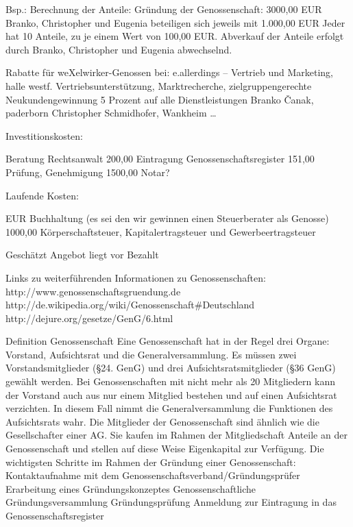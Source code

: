 Bsp.: Berechnung der Anteile:
Gründung der Genossenschaft: 3000,00 EUR
Branko, Christopher und Eugenia beteiligen sich jeweils mit 1.000,00 EUR
Jeder hat 10 Anteile, zu je einem Wert von 100,00 EUR.
Abverkauf der Anteile erfolgt durch Branko, Christopher und Eugenia abwechselnd.


Rabatte für weXelwirker-Genossen bei:
e.allerdings – Vertrieb und Marketing, halle westf.
Vertriebsunterstützung, Marktrecherche, zielgruppengerechte Neukundengewinnung
5 Prozent auf alle Dienstleistungen
Branko Čanak, paderborn
Christopher Schmidhofer, Wankheim
…


 
Investitionskosten:

Beratung Rechtsanwalt
200,00
Eintragung Genossenschaftsregister
151,00
Prüfung, Genehmigung
1500,00
Notar?









Laufende Kosten:

EUR
Buchhaltung (es sei den wir gewinnen einen Steuerberater als Genosse)
1000,00
Körperschaftsteuer, Kapitalertragsteuer und Gewerbeertragsteuer










Geschätzt
Angebot liegt vor
Bezahlt


Links zu weiterführenden Informationen zu Genossenschaften:
http://www.genossenschaftsgruendung.de
http://de.wikipedia.org/wiki/Genossenschaft\#Deutschland
http://dejure.org/gesetze/GenG/6.html

Definition Genossenschaft
Eine Genossenschaft hat in der Regel drei Organe: Vorstand, Aufsichtsrat und die Generalversammlung. Es müssen zwei Vorstandsmitglieder (\S 24. GenG) und drei Aufsichtsratsmitglieder (\S 36 GenG) gewählt werden. Bei Genossenschaften mit nicht mehr als 20 Mitgliedern kann der Vorstand auch aus nur einem Mitglied bestehen und auf einen Aufsichtsrat verzichten. In diesem Fall nimmt die Generalversammlung die Funktionen des Aufsichtsrats wahr.
Die Mitglieder der Genossenschaft sind ähnlich wie die Gesellschafter einer AG. Sie kaufen im Rahmen der Mitgliedschaft Anteile an der Genossenschaft und stellen auf diese Weise Eigenkapital zur Verfügung.
Die wichtigsten Schritte im Rahmen der Gründung einer Genossenschaft:
Kontaktaufnahme mit dem Genossenschaftsverband/Gründungsprüfer
Erarbeitung eines Gründungskonzeptes
Genossenschaftliche Gründungsversammlung
Gründungsprüfung
Anmeldung zur Eintragung in das Genossenschaftsregister
